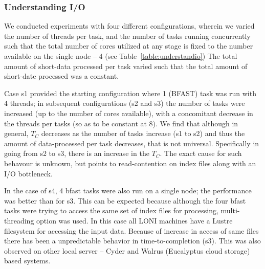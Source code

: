 \documentclass{cpeauth}
\begin{document}
\subsubsection{Understanding I/O}

We conducted experiments with four different configurations, wherein
we varied the number of threads per task, and the number of tasks
running concurrently such that the total number of cores utilized at
any stage is fixed to the number available on the single node -- 4
(see Table~\ref{table:understandio}) The total amount of short-data
processed per task varied such that the total amount of short-date
processed was a constant.

Case s1 provided the starting configuration where 1 (BFAST) task was
run with 4 threads; in subsequent configurations (s2 and s3) the
number of tasks were increased (up to the number of cores available),
with a concomitant decrease in the threads per tasks (so as to be
constant at 8). We find that although in general, $T_C$ decreases as
the number of tasks increase (s1 to s2) and thus the amount of
data-processed per task decreases, that is not universal. Specifically
in going from s2 to s3, there is an increase in the $T_C$.  The exact
cause for such behavour is unknown, but points to read-contention on
index files along with an I/O bottleneck.


In the case of s4, 4 bfast tasks were also run on a single node; the
performance was better than for s3. This can be expected because
although the four bfast tasks were trying to access the same set of
index files for processing, multi-threading option was used.  In this
case all LONI machines have a Lustre filesystem for accessing the
input data.  Because of increase in access of same files there has
been a unpredictable behavior in time-to-completion (s3). This was
also observed on other local server -- Cyder and Walrus (Eucalyptus
cloud storage) based systems.

\end{document}
